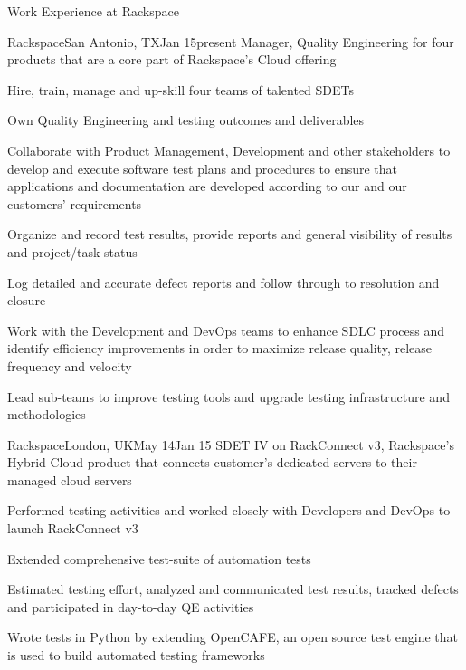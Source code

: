 \documentclass{resume} %
\begin{document}
\begin{rSection}{Work Experience at Rackspace}
\begin{rSubsection}{Rackspace}{San Antonio, TX}{Jan
    15}{present}
{Manager, Quality Engineering for four products that are a core part of Rackspace's Cloud offering}

\item Hire, train, manage and up-skill four teams of talented SDETs
\item Own Quality Engineering and testing outcomes and deliverables
\item Collaborate with Product Management, Development and other stakeholders to develop and execute software test plans and procedures to ensure that applications and documentation are developed according to our and our customers' requirements
\item Organize and record test results, provide reports and general visibility of results and project/task status
\item Log detailed and accurate defect reports and follow through to resolution and closure
\item Work with the Development and DevOps teams to enhance SDLC process and identify efficiency improvements in order to maximize release quality, release frequency and velocity
\item Lead sub-teams to improve testing tools and upgrade testing infrastructure and methodologies

\end{rSubsection}


\begin{rSubsection}{Rackspace}{London, UK}{May 14}{Jan 15}
{SDET IV on RackConnect v3, Rackspace's Hybrid Cloud product that connects customer's dedicated servers to their managed cloud servers}

\item Performed testing activities and worked closely with Developers and DevOps to launch RackConnect v3
\item Extended comprehensive test-suite of automation tests
\item Estimated testing effort, analyzed and communicated test results, tracked defects and participated in day-to-day QE activities
\item Wrote tests in Python by extending OpenCAFE, an open source test engine that is used to build automated testing frameworks
\end{rSubsection}
\end{rSection}
\end{document}
